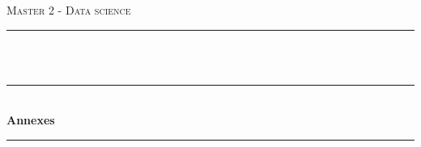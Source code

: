 
\begin{titlepage}
    \centering
    \vspace*{0.5 cm}
    \textsc{\Large Master 2 - Data science}\\[0.5 cm]     
    \rule{\linewidth}{0.2 mm} \\[0.4 cm]
    { \huge \bfseries \theauthor}\\
    \rule{\linewidth}{0.2 mm} \\[0.4 cm]
    { \huge \bfseries Annexes\\}%
    \rule{\linewidth}{0.2 mm} \\[1.5 cm]
\end{titlepage}